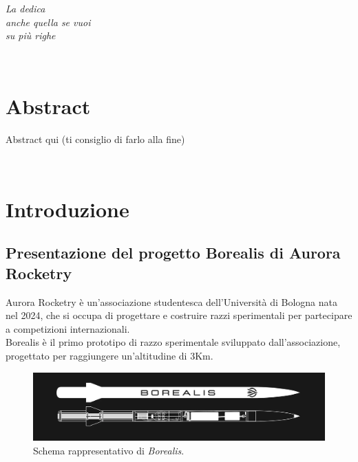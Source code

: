 \documentclass[12pt,a4paper,twoside]{book}
\begin{document}
\ifdefined\HCode
\else
    \topmargin=5.5cm
    \begin{flushright}
        \emph{
            \LARGE{La dedica}\\\vspace{3mm}
            \LARGE{anche quella se vuoi}\\\vspace{3mm}
            \LARGE{su più righe}
        }
    \end{flushright}
\fi
\newpage~\newpage
{}
\chapter*{Abstract}
Abstract qui (ti consiglio di farlo alla fine)

\topmargin=-1cm
\tableofcontents
\thispagestyle{empty}
\listoftables
\thispagestyle{empty}
\listoffigures
\thispagestyle{empty}
\newpage~\newpage


\setcounter{chapter}{0}
\raggedbottom
\chapter{Introduzione} \label{chap:intro}
\pagestyle{plain}
\setcounter{page}{1}

\section{Presentazione del progetto Borealis di Aurora Rocketry}
Aurora Rocketry è un'associazione studentesca dell'Università di Bologna nata
nel 2024, che si occupa di progettare e costruire razzi sperimentali per
partecipare a competizioni internazionali. \\
Borealis è il primo prototipo di razzo sperimentale sviluppato
dall'associazione, progettato per raggiungere un'altitudine di 3Km.

\begin{figure}[H]
    \centering
    \includegraphics[width=\textwidth]{img/borealis-schema.png}
    \caption{Schema rappresentativo di \emph{Borealis}.}
    \label{fig:borealis-schema}
\end{figure}
\end{document}

